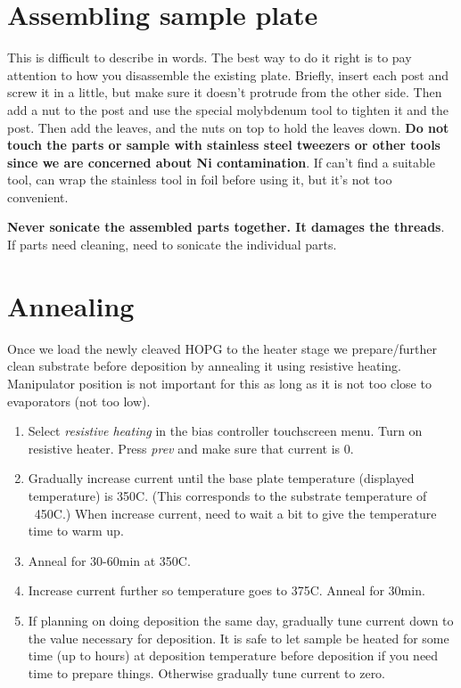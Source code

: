 \section{Assembling sample plate}
This is difficult to describe in words. The best way to do it right is to pay attention to  how you disassemble the existing plate. Briefly, insert each post and screw it in a little, but make sure it doesn't protrude from the other side. Then add a nut to the post and use the special molybdenum tool to tighten it and the post. Then add the leaves, and the nuts on top to hold the leaves down. \textbf{Do not touch the parts or sample with stainless steel tweezers or other tools since we are concerned about Ni contamination}. If can't find a suitable tool, can wrap the stainless tool in foil before using it, but it's not too convenient.  

\textbf{Never sonicate the assembled parts together. It damages the threads}. If parts need cleaning, need to sonicate the individual parts.
\section{Annealing}
Once we load the newly cleaved HOPG to the heater stage we prepare/further clean substrate before deposition by annealing it using resistive heating. Manipulator position is not important for this as long as it is not too close to evaporators (not too low).
\begin{enumerate}
\item Select \emph{resistive heating} in the bias controller touchscreen menu. Turn on resistive heater. Press \emph{prev} and make sure that current is 0. 
\item	Gradually increase current until the base plate temperature (displayed temperature) is 350C. (This corresponds to the substrate temperature of ~450C.) When increase current, need to wait a bit to give the temperature time to warm up. 
\item	Anneal for 30-60min at 350C.
\item	Increase current further so temperature goes to 375C. Anneal for 30min.
\item	If planning on doing deposition the same day, gradually tune current down to the value necessary for deposition. It is safe to let sample be heated for some time (up to hours) at deposition temperature before deposition if you need time to prepare things. Otherwise gradually tune current to zero.
\end{enumerate}